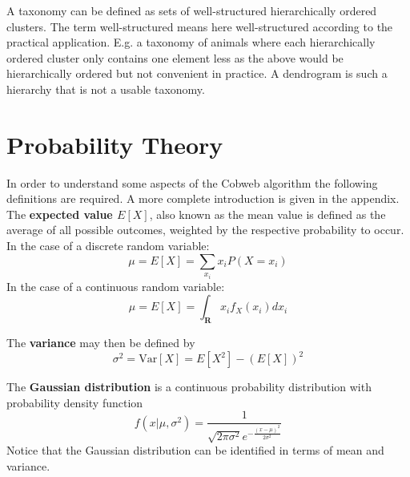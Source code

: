 A taxonomy can be defined as sets of well-structured hierarchically ordered clusters. The term well-structured means here well-structured according to the practical application. E.g. a taxonomy of animals where each hierarchically ordered cluster only contains one element less as the above would be hierarchically ordered but not convenient in practice. A dendrogram is such a hierarchy that is not a usable taxonomy.

\section{Probability Theory}\label{\positionnumber}
In order to understand some aspects of the Cobweb algorithm the following definitions are required. A more complete introduction is given in the appendix.\\

The \textbf{expected value $E[X]$}, also known as the mean value is defined as the average of all possible outcomes, weighted by the respective probability to occur.
In the case of a discrete random variable: \[ \mu = E[X] = \sum_{x_i} x_i P(X=x_i)  \]
In the case of a continuous random variable: \[ \mu = E[X] = \int_{\mathbf{R}} x_i f_X(x_i)dx_i  \]

The \textbf{variance} may then be defined by \[ \sigma^2 = \text{Var}[X] = E[X^2] - (E[X])^2 \]

The \textbf{Gaussian distribution} is a continuous probability distribution with probability density function \[ f(x | \mu, \sigma^2) = \frac{1}{\sqrt{2 \pi \sigma^2}e^{-\frac{(x-\mu)^2}{2\sigma^2}}} \]
Notice that the Gaussian distribution can be identified in terms of mean and variance.
